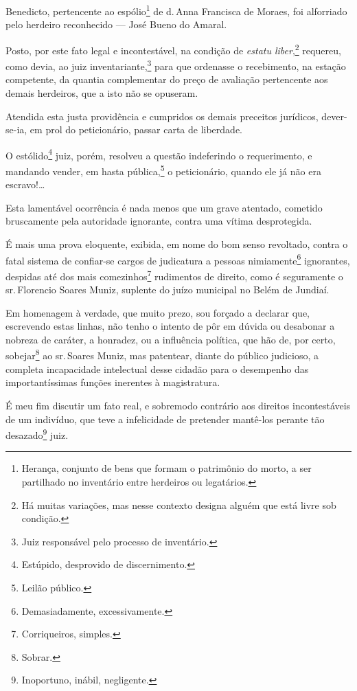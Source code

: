 Benedicto, pertencente ao espólio\footnote{Herança, conjunto de bens
  que formam o patrimônio do morto, a ser partilhado no inventário entre
  herdeiros ou legatários.} de d.\,Anna Francisca de Moraes, foi
alforriado pelo herdeiro reconhecido --- José Bueno do Amaral.

Posto, por este fato legal e incontestável, na condição de \emph{estatu
liber},\footnote{Há muitas variações, mas nesse contexto designa alguém
  que está livre sob condição.} requereu, como devia, ao juiz
inventariante,\footnote{Juiz responsável pelo processo de inventário.}
para que ordenasse o recebimento, na estação competente, da quantia
complementar do preço de avaliação pertencente aos demais herdeiros, que
a isto não se opuseram.

Atendida esta justa providência e cumpridos os demais preceitos
jurídicos, dever-se-ia, em prol do peticionário, passar carta de
liberdade.

O estólido\footnote{Estúpido, desprovido de discernimento.} juiz,
porém, resolveu a questão indeferindo o requerimento, e mandando vender,
em hasta pública,\footnote{Leilão público.} o peticionário, quando ele
já não era escravo!\ldots{}

Esta lamentável ocorrência é nada menos que um grave atentado, cometido
bruscamente pela autoridade ignorante, contra uma vítima desprotegida.

É mais uma prova eloquente, exibida, em nome do bom senso revoltado,
contra o fatal sistema de confiar-se cargos de judicatura a pessoas
nimiamente\footnote{Demasiadamente, excessivamente.} ignorantes,
despidas até dos mais comezinhos\footnote{Corriqueiros, simples.}
rudimentos de direito, como é seguramente o sr.\,Florencio Soares Muniz,
suplente do juízo municipal no Belém de Jundiaí.

Em homenagem à verdade, que muito prezo, sou forçado a declarar que,
escrevendo estas linhas, não tenho o intento de pôr em dúvida ou
desabonar a nobreza de caráter, a honradez, ou a influência política,
que hão de, por certo, sobejar\footnote{Sobrar.} ao sr.\,Soares Muniz,
mas patentear, diante do público judicioso, a completa incapacidade
intelectual desse cidadão para o desempenho das importantíssimas funções
inerentes à magistratura.

É meu fim discutir um fato real, e sobremodo contrário aos direitos
incontestáveis de um indivíduo, que teve a infelicidade de pretender
mantê-los perante tão desazado\footnote{Inoportuno, inábil,
  negligente.} juiz.

